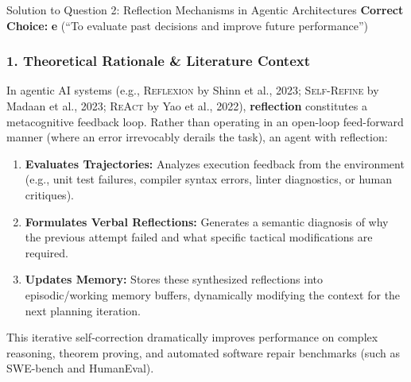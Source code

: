 \documentclass[11pt,a4paper]{article}
\begin{document}
\begin{solutionbox}{Solution to Question 2: Reflection Mechanisms in Agentic Architectures}
\textbf{Correct Choice:} \textbf{e} (``To evaluate past decisions and improve future performance'')

\subsubsection*{1. Theoretical Rationale \& Literature Context}
In agentic AI systems (e.g., \textsc{Reflexion} by Shinn et al., 2023; \textsc{Self-Refine} by Madaan et al., 2023; \textsc{ReAct} by Yao et al., 2022), \textbf{reflection} constitutes a metacognitive feedback loop. Rather than operating in an open-loop feed-forward manner (where an error irrevocably derails the task), an agent with reflection:
\begin{enumerate}
    \item \textbf{Evaluates Trajectories:} Analyzes execution feedback from the environment (e.g., unit test failures, compiler syntax errors, linter diagnostics, or human critiques).
    \item \textbf{Formulates Verbal Reflections:} Generates a semantic diagnosis of why the previous attempt failed and what specific tactical modifications are required.
    \item \textbf{Updates Memory:} Stores these synthesized reflections into episodic/working memory buffers, dynamically modifying the context for the next planning iteration.
\end{enumerate}
This iterative self-correction dramatically improves performance on complex reasoning, theorem proving, and automated software repair benchmarks (such as SWE-bench and HumanEval).


\end{solutionbox}
\end{document}
